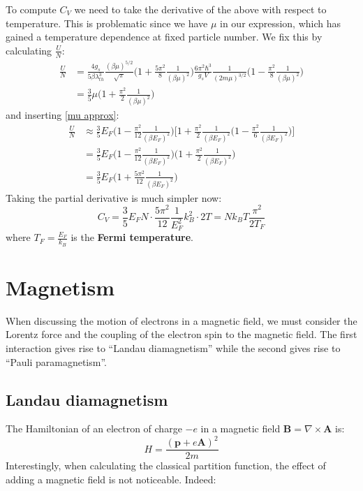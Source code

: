 \documentclass[a4paper,11pt,oneside]{book}
\begin{document}
To compute $C_V$ we need to take the derivative of the above with respect to temperature. This is problematic since we have $\mu$ in our expression, which has gained a temperature dependence at fixed particle number. We fix this by calculating $\frac{U}{N}$:
\begin{align}
    \frac{U}{N} &= \frac{4g_s}{5\beta \lambda_{th}^3} \frac{(\beta \mu)^{5/2}}{\sqrt{\pi}}\bigg(1+\frac{5\pi^2}{8}\frac{1}{(\beta \mu)^2}\bigg)\frac{6\pi^2 \hbar^3}{g_sV}\frac{1}{(2m\mu)^{3/2}}\bigg(1-\frac{\pi^2}{8}\frac{1}{(\beta \mu)^2}\bigg)\\
    &=\frac{3}{5}\mu \bigg(1+\frac{\pi^2}{2}\frac{1}{(\beta \mu)^2}\bigg)
\end{align}
and inserting \eqref{mu approx}:
\begin{align}
    \frac{U}{N} &\approx \frac{3}{5}E_F\bigg(1-\frac{\pi^2}{12}\frac{1}{(\beta E_F)^2}\bigg)\bigg[1+\frac{\pi^2}{2}\frac{1}{(\beta E_F)^2}\bigg(1-\frac{\pi^2}{6}\frac{1}{(\beta E_F)^2}\bigg)\bigg]\\
    &=\frac{3}{5}E_F\bigg(1-\frac{\pi^2}{12}\frac{1}{(\beta E_F)^2}\bigg)\bigg(1+\frac{\pi^2}{2}\frac{1}{(\beta E_F)^2}\bigg)\\
    &= \frac{3}{5}E_F\bigg(1+\frac{5\pi^2}{12}\frac{1}{(\beta E_F)^2}\bigg)
\end{align}
Taking the partial derivative is much simpler now:
\begin{equation}
    C_V = \frac{3}{5}E_F N \cdot \frac{5\pi^2}{12}\frac{1}{E_F^2}k_B^2 \cdot 2T = Nk_B T\frac{\pi^2}{2T_F}
\end{equation}
where $T_F = \frac{E_F}{k_B}$ is the \textbf{Fermi temperature}.
\section{Magnetism}
When discussing the motion of electrons in a magnetic field, we must consider the Lorentz force and the coupling of the electron spin to the magnetic field. The first interaction gives rise to \enquote{Landau diamagnetism} while the second gives rise to \enquote{Pauli paramagnetism}. 
\subsection{Landau diamagnetism}
The Hamiltonian of an electron of charge $-e$ in a magnetic field $\textbf{B} = \nabla \times \textbf{A}$ is:
\begin{equation}
    H = \frac{(\textbf{p}+e\textbf{A})^2}{2m}
\end{equation}
Interestingly, when calculating the classical partition function, the effect of adding a magnetic field is not noticeable. Indeed:
\end{document}
